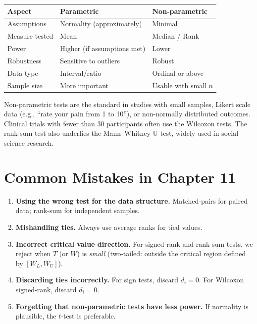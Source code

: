 \documentclass[12pt, a4paper, oneside]{book}
\theoremstyle{definition}
\theoremstyle{plain}
\theoremstyle{remark}
\begin{document}
\begin{center}
\begin{tabular}{lll}
\toprule
\textbf{Aspect} & \textbf{Parametric} & \textbf{Non-parametric} \\
\midrule
Assumptions     & Normality (approximately) & Minimal \\
Measure tested  & Mean                & Median / Rank \\
Power           & Higher (if assumptions met) & Lower \\
Robustness      & Sensitive to outliers & Robust \\
Data type       & Interval/ratio      & Ordinal or above \\
Sample size     & More important      & Usable with small $n$ \\
\bottomrule
\end{tabular}
\end{center}

\begin{realworld}
Non-parametric tests are the standard in studies with small samples, Likert
scale data (e.g., ``rate your pain from 1 to 10''), or non-normally
distributed outcomes.  Clinical trials with fewer than 30 participants often
use the Wilcoxon tests.  The rank-sum test also underlies the Mann--Whitney U
test, widely used in social science research.
\end{realworld}

\section{Common Mistakes in Chapter 11}

\begin{warningbox}
\begin{enumerate}[label=\textbf{\arabic*.}]
  \item \textbf{Using the wrong test for the data structure.}  Matched-pairs
        for paired data; rank-sum for independent samples.
  \item \textbf{Mishandling ties.}  Always use average ranks for tied values.
  \item \textbf{Incorrect critical value direction.}  For signed-rank and
        rank-sum tests, we reject when $T$ (or $W$) is \emph{small} (two-tailed:
        outside the critical region defined by $[W_L, W_U]$).
  \item \textbf{Discarding ties incorrectly.}  For sign tests, discard
        $d_i=0$.  For Wilcoxon signed-rank, discard $d_i=0$.
  \item \textbf{Forgetting that non-parametric tests have less power.}
        If normality is plausible, the $t$-test is preferable.
\end{enumerate}
\end{warningbox}
\end{document}

